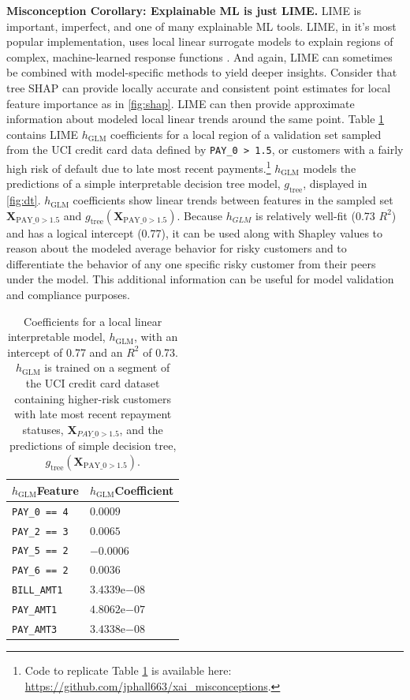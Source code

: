\documentclass[fleqn]{article}
\begin{document}
\textbf{Misconception Corollary: Explainable ML is just LIME.} LIME is important, imperfect, and one of many explainable ML tools. LIME, in it's most popular implementation, uses local linear surrogate models to explain regions of complex, machine-learned response functions \cite{lime}. And again, LIME can sometimes be combined with model-specific methods to yield deeper insights. Consider that tree SHAP can provide locally accurate and consistent point estimates for local feature importance as in \ref{fig:shap}. LIME can then provide approximate information about modeled local linear trends around the same point. Table \ref{tab:lime} contains LIME $h_{\text{GLM}}$ coefficients for a local region of a validation set sampled from the UCI credit card data defined by \texttt{PAY\_0 > 1.5}, or customers with a fairly high risk of default due to late most recent payments.\footnote{Code to replicate Table \ref{tab:lime} is available here: \url{https://github.com/jphall663/xai_misconceptions}.} $h_{\text{GLM}}$ models the predictions of a simple interpretable decision tree model, $g_{\text{tree}}$, displayed in \ref{fig:dt}. $h_{\text{GLM}}$ coefficients show linear trends between features in the sampled set $\mathbf{X}_{\text{PAY\_0} > 1.5}$ and $g_{\text{tree}}(\mathbf{X}_{\text{PAY\_0}> 1.5})$. Because $h_{GLM}$ is relatively well-fit (0.73 $R^2$) and has a logical intercept (0.77), it can be used along with Shapley values to reason about the modeled average behavior for risky customers and to differentiate the behavior of any one specific risky customer from their peers under the model. This additional information can be useful for model validation and compliance purposes.

\begin{table}[htb!]
	\caption{Coefficients for a local linear interpretable model, $h_{\text{GLM}}$, with an intercept of 0.77 and an $R^2$ of 0.73. $h_{\text{GLM}}$ is trained on a segment of the UCI credit card dataset containing higher-risk customers with late most recent repayment statuses, $\mathbf{X}_{PAY \_ 0 > 1.5}$, and the predictions of simple decision tree, $g_{\text{tree}}(\mathbf{X}_{\text{PAY\_0} > 1.5})$.}
		\centering
				\begin{tabular}{ | p{2cm} | p{1.7cm} | }
				\hline
				$h_{\text{GLM}}$\newline Feature & $h_{\text{GLM}}$\newline Coefficient \\ 
				\hline
				\texttt{PAY\_0 == 4} & $0.0009$ \\
				\hline
				\texttt{PAY\_2 == 3} & $0.0065$ \\
				\hline
				\texttt{PAY\_5 == 2} & $-0.0006$ \\
				\hline
				\texttt{PAY\_6 == 2} & $0.0036$ \\
				\hline				
				\texttt{BILL\_AMT1} & $3.4339\mathrm{e}{-08}$ \\
				\hline
				\texttt{PAY\_AMT1} & $4.8062\mathrm{e}{-07}$ \\
				\hline	
				\texttt{PAY\_AMT3} & $3.4338\mathrm{e}{-08}$ \\	
				\hline	
			\end{tabular}	
  		\label{tab:lime}
\end{table}	
\end{document}
